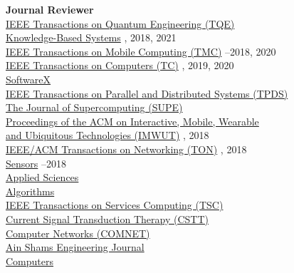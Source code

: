 {\bf Journal Reviewer}\\
{\href{https://tqe.ieee.org/}{IEEE Transactions on Quantum Engineering (TQE)}} \\
{\href{https://www.journals.elsevier.com/knowledge-based-systems}{Knowledge-Based Systems}} , 2018, 2021\\
{\href{https://www.computer.org/portal/web/tmc}{IEEE Transactions on Mobile Computing (TMC)}} --2018, 2020\\
{\href{https://www.computer.org/web/tc}{IEEE Transactions on Computers (TC)}} , 2019, 2020\\
{\href{https://www.journals.elsevier.com/softwarex}{SoftwareX}} \\
{\href{https://www.computer.org/csdl/journal/td}{IEEE Transactions on Parallel and Distributed Systems (TPDS)}} \\
{\href{https://www.springer.com/computer/swe/journal/11227}{The Journal of Supercomputing (SUPE)}} \\
{\href{https://imwut.acm.org}{Proceedings of the ACM on Interactive, Mobile, Wearable \\\mbox{\hspace{0.6cm}} and Ubiquitous Technologies (IMWUT)}} , 2018\\
{\href{http://ieeexplore.ieee.org/xpl/RecentIssue.jsp?punumber=90}{IEEE/ACM Transactions on Networking (TON)}} , 2018\\
{\href{http://www.mdpi.com/journal/sensors}{Sensors}} --2018\\
{\href{http://www.mdpi.com/journal/applsci}{Applied Sciences}} \\
{\href{http://www.mdpi.com/journal/algorithms}{Algorithms}} \\
{\href{https://www.computer.org/web/tsc}{IEEE Transactions on Services Computing (TSC)}} \\
{\href{http://benthamscience.com/journals/current-signal-transduction-therapy/}{Current Signal Transduction Therapy (CSTT)}} \\
{\href{http://ees.elsevier.com/comnet/}{Computer Networks (COMNET)}} \\
{\href{https://www.journals.elsevier.com/ain-shams-engineering-journal}{Ain Shams Engineering Journal}} \\
{\href{http://www.mdpi.com/journal/computers}{Computers}} \\
